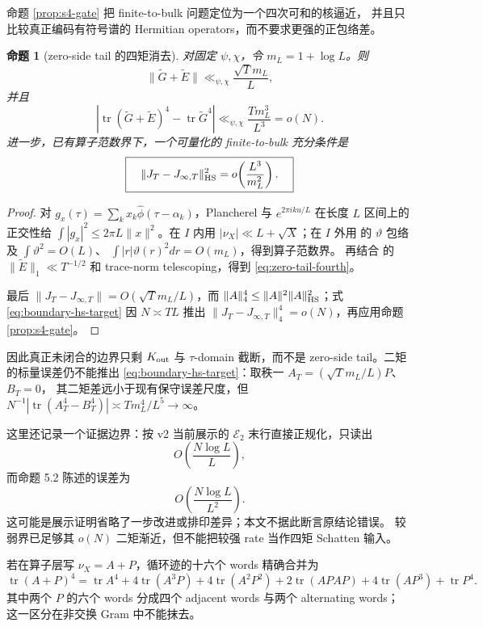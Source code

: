 \documentclass[UTF8,11pt,a4paper]{ctexart}
\newtheorem{proposition}[theorem]{命题}
\theoremstyle{definition}
\theoremstyle{remark}
\newcommand{\tr}{\operatorname{tr}}
\begin{document}
命题 \ref{prop:s4-gate} 把 finite-to-bulk 问题定位为一个四次可和的核逼近，
并且只比较真正编码有符号谱的 Hermitian operators，而不要求更强的正包络差。

\begin{proposition}[zero-side tail 的四矩消去]\label{prop:zero-tail-fourth}
对固定 $\psi,\chi$，令 $m_L=1+\log L$。则
\[
 \|\widetilde G+\widetilde E\|
 \ll_{\psi,\chi}\frac{\sqrt Tm_L}{L},
\]
并且
\[
 \left|\tr(\widetilde G+\widetilde E)^4-\tr\widetilde G^4\right|
 \ll_{\psi,\chi}\frac{Tm_L^3}{L^3}=o(N).
 \label{eq:zero-tail-fourth}
\]
进一步，已有算子范数界下，一个可量化的 finite-to-bulk 充分条件是
\[
 \boxed{\quad
 \|J_T-J_{\infty,T}\|_{\rm HS}^2
 =o\!\left(\frac{L^3}{m_L^2}\right).
 \quad}
 \label{eq:boundary-hs-target}
\]
\end{proposition}

\begin{proof}
对 $g_x(\tau)=\sum_kx_k\widehat\phi(\tau-\alpha_k)$，Plancherel 与
$e^{2\pi iku/L}$ 在长度 $L$ 区间上的正交性给
$\int|g_x|^2\le2\pi L\|x\|^2$。在 $I$ 内用
$|\nu_X|\ll L+\sqrt X$；在 $I$ 外用 \cite[(5.3)--(5.4)]{AF26} 的
$\vartheta$ 包络及 $\int\vartheta^2=O(L)$、
$\int |r|\vartheta(r)^2dr=O(m_L)$，得到算子范数界。
再结合 \cite[Prop.~4.3]{AF26} 的
$\|\widetilde E\|_1\ll T^{-1/2}$ 和 trace-norm telescoping，得到
\eqref{eq:zero-tail-fourth}。

最后 $\|J_T-J_{\infty,T}\|=O(\sqrt Tm_L/L)$，而
$\|A\|_4^4\le\|A\|^2\|A\|_{\rm HS}^2$；式
\eqref{eq:boundary-hs-target} 因 $N\asymp TL$ 推出
$\|J_T-J_{\infty,T}\|_4^4=o(N)$，再应用命题 \ref{prop:s4-gate}。
\end{proof}

因此真正未闭合的边界只剩 $K_{\rm out}$ 与 $\tau$-domain 截断，而不是
zero-side tail。二矩的标量误差仍不能推出
\eqref{eq:boundary-hs-target}：取秩一 $A_T=(\sqrt Tm_L/L)P$、$B_T=0$，
其二矩差远小于现有保守误差尺度，但
$N^{-1}|\tr(A_T^4-B_T^4)|\asymp Tm_L^4/L^5\to\infty$。

这里还记录一个证据边界：按 \cite[\S5.2]{AF26} v2 当前展示的
$\mathcal E_2$ 末行直接正规化，只读出
\[
 O\!\left(\frac{N\log L}{L}\right),
\]
而命题 5.2 陈述的误差为
\[
 O\!\left(\frac{N\log L}{L^2}\right).
\]
这可能是展示证明省略了一步改进或排印差异；本文不据此断言原结论错误。
较弱界已足够其 $o(N)$ 二矩渐近，但不能把较强 rate 当作四矩 Schatten 输入。

若在算子层写 $\nu_X=A+P$，循环迹的十六个 words 精确合并为
\[
 \tr(A+P)^4
 =\tr A^4+4\tr(A^3P)+4\tr(A^2P^2)
 +2\tr(APAP)+4\tr(AP^3)+\tr P^4.
 \label{eq:cyclic-words}
\]
其中两个 $P$ 的六个 words 分成四个 adjacent words 与两个 alternating words；
这一区分在非交换 Gram 中不能抹去。
\end{document}
